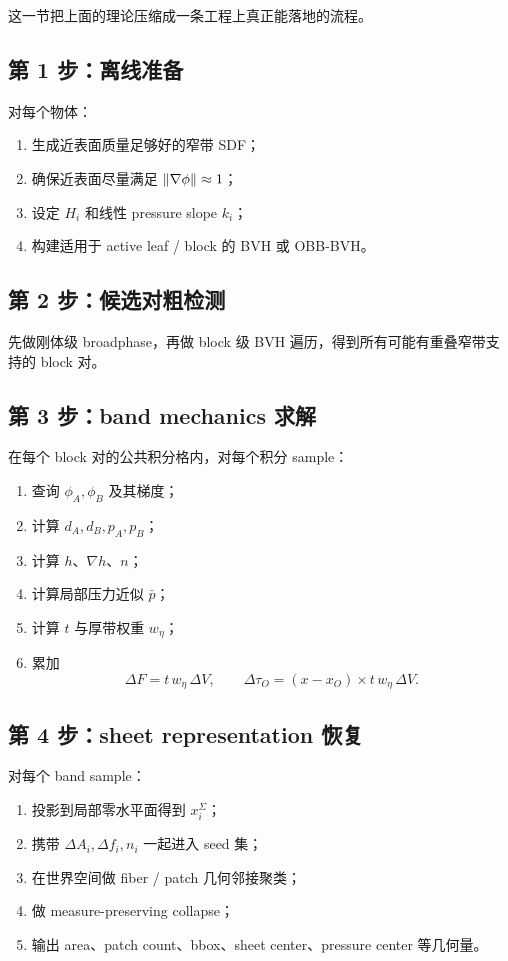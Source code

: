 \documentclass[12pt,a4paper]{ctexart}
\begin{document}
这一节把上面的理论压缩成一条工程上真正能落地的流程。

\subsection{第 1 步：离线准备}
对每个物体：
\begin{enumerate}
    \item 生成近表面质量足够好的窄带 SDF；
    \item 确保近表面尽量满足 $\norm{\nabla \phi}\approx 1$；
    \item 设定 $H_i$ 和线性 pressure slope $k_i$；
    \item 构建适用于 active leaf / block 的 BVH 或 OBB-BVH。
\end{enumerate}

\subsection{第 2 步：候选对粗检测}
先做刚体级 broadphase，再做 block 级 BVH 遍历，得到所有可能有重叠窄带支持的 block 对。

\subsection{第 3 步：band mechanics 求解}
在每个 block 对的公共积分格内，对每个积分 sample：
\begin{enumerate}
    \item 查询 $\phi_A,\phi_B$ 及其梯度；
    \item 计算 $d_A,d_B,p_A,p_B$；
    \item 计算 $h$、$\nabla h$、$n$；
    \item 计算局部压力近似 $\bar p$；
    \item 计算 $t$ 与厚带权重 $w_\eta$；
    \item 累加
    \begin{equation}
        \Delta F = t\,w_\eta\,\Delta V,
        \qquad
        \Delta \tau_O = (x-x_O)\times t\,w_\eta\,\Delta V.
    \end{equation}
\end{enumerate}

\subsection{第 4 步：sheet representation 恢复}
对每个 band sample：
\begin{enumerate}
    \item 投影到局部零水平面得到 $x_i^{\Sigma}$；
    \item 携带 $\Delta A_i, \Delta f_i, n_i$ 一起进入 seed 集；
    \item 在世界空间做 fiber / patch 几何邻接聚类；
    \item 做 measure-preserving collapse；
    \item 输出 area、patch count、bbox、sheet center、pressure center 等几何量。
\end{enumerate}
\end{document}
